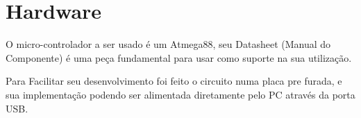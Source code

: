 \documentclass[titlepage, a4paper, 10pt, reqno, openany]{report}
\begin{document}
\section{Hardware}
O micro-controlador a ser usado \'{e} um Atmega88, seu Datasheet (Manual do Componente) \'{e} uma pe\c{c}a fundamental para usar como suporte na sua utiliza\c{c}\~{a}o. \\

Para Facilitar seu desenvolvimento foi feito o circuito numa placa pre furada, e sua implementa\c{c}\~{a}o podendo ser alimentada diretamente pelo PC através da porta USB.
\end{document}
